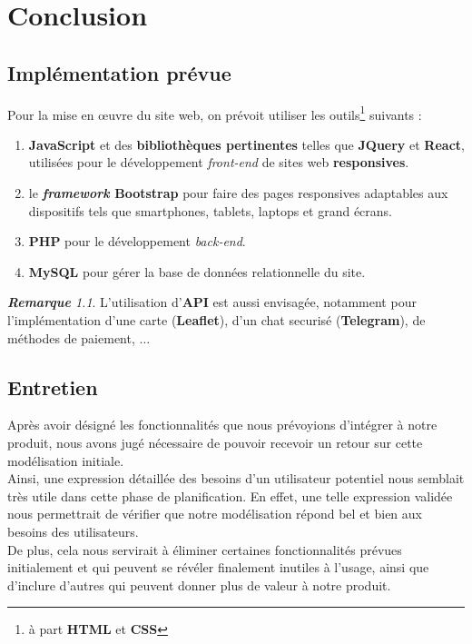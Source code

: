 \documentclass[a4paper,12pt]{report}
\theoremstyle{break}
\theoremstyle{break}
\theoremstyle{break}
\theoremstyle{break}
\theoremstyle{definition}
\theoremstyle{remark}
\newtheorem*{remark}{\textbf{Remarque}}
\begin{document}
\chapter{Conclusion}
\section{Implémentation prévue}
Pour la mise en \oe{}uvre du site web, on prévoit utiliser les outils\footnote{à part \textbf{HTML} et \textbf{CSS}} suivants :
\begin{enumerate}
  \item{\textbf{JavaScript} et des \textbf{bibliothèques pertinentes} telles que \textbf{JQuery} et \textbf{React}, utilisées pour le développement \textit{front-end} de sites web \textbf{responsives}.}
  \item{le \textbf{\textit{framework} Bootstrap} pour faire des pages responsives adaptables aux dispositifs tels que smartphones, tablets, laptops et grand écrans.}
  \item{\textbf{PHP} pour le développement \textit{back-end}.}
  \item{\textbf{MySQL} pour gérer la base de données relationnelle du site.}
\end{enumerate}

\begin{remark}
L'utilisation d'\textbf{API} est aussi envisagée, notamment pour l'implémentation d'une carte (\textbf{Leaflet}), d'un chat securisé (\textbf{Telegram}), de méthodes de paiement, $\dots$
\end{remark}
\section{Entretien}
Après avoir désigné les fonctionnalités que nous prévoyions d'intégrer à notre produit, nous avons jugé nécessaire de pouvoir recevoir un retour sur cette modélisation initiale.\\
Ainsi, une expression détaillée des besoins d'un utilisateur potentiel nous semblait très utile dans cette phase de planification. En effet, une telle expression validée nous permettrait de vérifier que notre modélisation répond bel et bien aux besoins des utilisateurs.\\
De plus, cela nous servirait à éliminer certaines fonctionnalités prévues initialement et qui peuvent se révéler finalement inutiles à l'usage, ainsi que d'inclure d'autres qui peuvent donner plus de valeur à notre produit.
\end{document}
